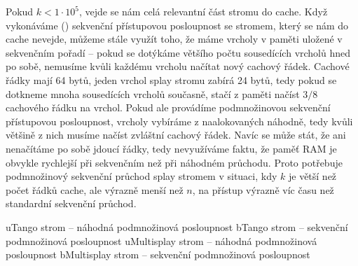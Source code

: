 Pokud $k < 1\cdot10^5$, vejde se nám celá relevantní část stromu do cache. Když
vykonáváme () sekvenční přístupovou posloupnost se stromem,
který se nám do cache nevejde, můžeme stále využít toho, že máme vrcholy v
paměti uložené v sekvenčním pořadí -- pokud se dotýkáme většího počtu
sousedících vrcholů hned po sobě, nemusíme kvůli každému vrcholu načítat nový
cachový řádek. Cachové řádky mají 64 bytů, jeden vrchol splay stromu zabírá 24
bytů, tedy pokud se dotkneme mnoha sousedících vrcholů současně, stačí z paměti
načíst $3/8$ cachového řádku na vrchol. Pokud ale provádíme podmnožinovou
sekvenční přístupovou posloupnost, vrcholy vybíráme z naalokovaných náhodně,
tedy kvůli většině z nich musíme načíst zvláštní cachový řádek. Navíc se může
stát, že ani nenačítáme po sobě jdoucí řádky, tedy nevyužíváme faktu, že paměť
RAM je obvykle rychlejší při sekvenčním než při náhodném průchodu. Proto
potřebuje podmnožinový sekvenční průchod splay stromem v situaci, kdy $k$ je
větší než počet řádků cache, ale výrazně menší než $n$, na přístup výrazně víc
času než standardní sekvenční průchod. 

u{Tango strom -- náhodná podmnožinová posloupnost}
b{Tango strom -- sekvenční podmnožinová posloupnost}
u{Multisplay strom -- náhodná podmnožinová posloupnost}
b{Multisplay strom -- sekvenční podmnožinová posloupnost}


